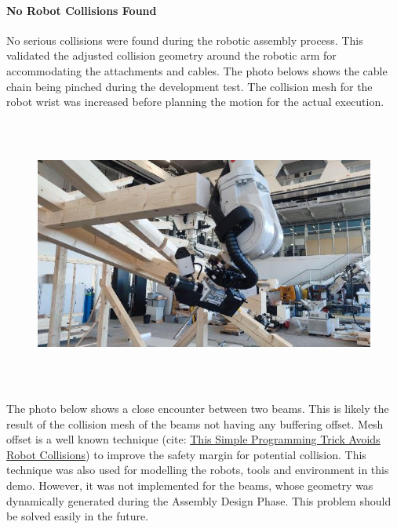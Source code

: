 \documentclass[11pt]{book}
\begin{document}
\paragraph{No Robot Collisions Found}

No serious collisions were found during the robotic assembly process. This validated the adjusted collision geometry around the robotic arm for accommodating the attachments and cables. The photo belows shows the cable chain being pinched during the development test. The collision mesh for the robot wrist was increased before planning the motion for the actual execution.

\begin{figure}[H]
\includegraphics[width=15.92cm,height=8.96cm]{./images/image75.jpeg}
\end{figure}


The photo below shows a close encounter between two beams. This is likely the result of the collision mesh of the beams not having any buffering offset. Mesh offset is a well known technique (cite: \href{https://robodk.com/blog/programming-tips-collisions/}{\uline{This Simple Programming Trick Avoids Robot Collisions}}) to improve the safety margin for potential collision. This technique was also used for modelling the robots, tools and environment in this demo. However, it was not implemented for the beams, whose geometry was dynamically generated during the Assembly Design Phase. This problem should be solved easily in the future.
\end{document}

